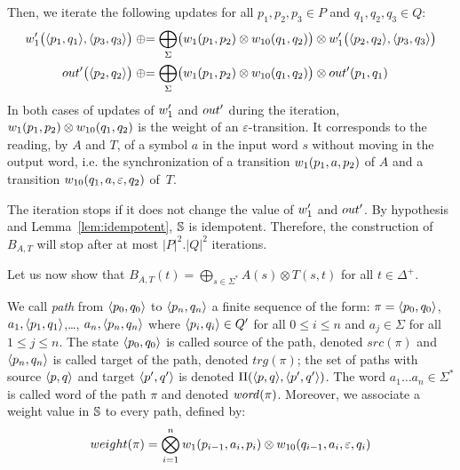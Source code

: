 \noindent
Then, we iterate the following updates for all $p_1, p_2, p_3\in P$ 
and $q_1, q_2, q_3 \in Q$:
%
\begin{align}
\wei'_1\bigl( \< p_1, q_1>, \< p_3, q_3>\bigr) & \opluseq 
\bigoplus_\Sigma \bigl(\wei_{1}(p_1, p_2) \otimes \wei_{10}(q_1, q_2)\bigr)
\otimes \wei'_1\bigl( \< p_2, q_2>, \< p_3, q_3>\bigr) \label{eq:iter-wei}\\
%
\final'\bigl(\<p_2, q_2>\bigr) & \opluseq 
\bigoplus_\Sigma \bigl(\wei_{1}(p_1, p_2)\otimes \wei_{10}(q_1, q_2)\bigr)
\otimes \final'(p_1, q_1) \label{eq:iter-final}
\end{align}
%
In both cases of updates of $\wei'_1$ and $\final'$ during the iteration, 
$\wei_{1}(p_1, p_2) \otimes \wei_{10}(q_1, q_2)$ 
is the weight of an $\varepsilon$-transition.
It corresponds to the reading, by $A$ and $T$, 
of a symbol $a$ in the input word $s$ without moving in the output word,
i.e. the synchronization of 
a transition $\wei_{1}(p_1, a, p_2)$ of $A$ and 
a transition $\wei_{10}(q_1, a, \varepsilon, q_2)$ of~$T$.

The iteration stops if it does not change the value of $\wei'_1$ and $\final'$.
By hypothesis and Lemma~\ref{lem:idempotent}, 
$\mathbb{S}$ is idempotent. 
Therefore, the construction of $B_{A, T}$ will stop after 
at most $|P|^2 . |Q|^2$ iterations.

\smallskip
Let us now show that 
$B_{A, T}(t) = \displaystyle\bigoplus_{s\in \Sigma^*} A(s) \otimes T(s, t)$
for all $t\in \Delta^+$.

\noindent
We call \emph{path} from $\< p_0, q_0>$ to $\< p_n, q_n>$ 
a finite sequence of the form:
$\pi = \< p_0, q_0>$, $a_1, \< p_1, q_1>$,\ldots, $a_n, \< p_n, q_n>$
where $\< p_i, q_i> \in Q'$ for all $0 \leq i \leq n$
and $a_j \in \Sigma$ for all $1 \leq j \leq n$.
The state $\< p_0, q_0>$ is called source of the path, denoted $\mathit{src}(\pi)$
and $\< p_n, q_n>$ is called target of the path, denoted $\mathit{trg}(\pi)$;
the set of paths with source $\< p, q>$ and target $\< p', q'>$ 
is denoted $\Pi(\< p, q>, \< p', q'>)$.
The word $a_1\ldots a_n \in \Sigma^*$ is called word of the path $\pi$
and denoted $\mathit{word}(\pi)$.
Moreover, we associate a weight value in $\mathbb{S}$ to every path, 
defined by:
\begin{equation} \label{def:weight-path}
\weight(\pi) = \bigotimes_{i = 1}^{n} 
\wei_1(p_{i-1}, a_i, p_i) \otimes
\wei_{10}(q_{i-1}, a_i, \varepsilon, q_i)
\end{equation}

